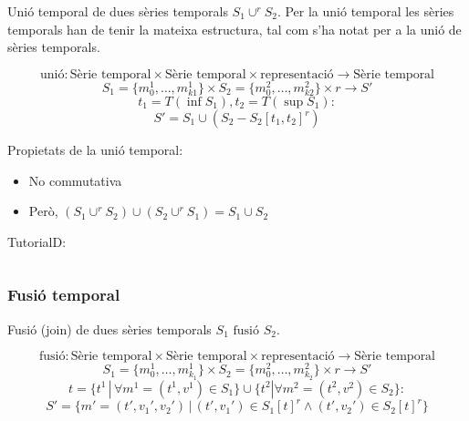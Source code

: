 Unió temporal de dues sèries temporals $S_1 \cup^r S_2$. Per la unió temporal les sèries temporals han de tenir la mateixa estructura, tal com s'ha notat per a la unió de sèries temporals.

\begin{definition}
  \[
  \text{unió}: \text{Sèrie temporal} \times \text{Sèrie temporal}
  \times \text{representació} \longrightarrow \text{Sèrie temporal}
  \]
  \[
  S_1 = \{m_0^1 , \ldots , m_{k1}^1\}  \times S_2 = \{m_0^2 , \ldots , m_{k2}^2\} \times r \longrightarrow S'
  \]
  \[
  t_1=T(\inf S_1), t_2=T(\sup S_1):
  \]
  \[
  S' = S_1 \cup  ( S_2 - S_2[t_1,t_2]^r )
  \] 
\end{definition}



Propietats de la unió temporal:
\begin{itemize}
\item No commutativa
\item Però, $(S_1 \cup^r S_2) \cup (S_2 \cup^r S_1) = S_1 \cup S_2$
\end{itemize}



TutorialD:
\begin{verbatim}

\end{verbatim}




\subsubsection{Fusió temporal}

Fusió (join) de dues sèries temporals $S_1 \text{ fusió } S_2$.


\begin{definition}
  \[
  \text{fusió}: \text{Sèrie temporal} \times
  \text{Sèrie temporal} \times \text{representació} \longrightarrow
  \text{Sèrie temporal}
  \]
  \[
  S_1 = \{m_0^1 , \ldots , m_{k_1}^1\} \times S_2 = \{m_0^2 , \ldots ,
  m_{k_2}^2\} \times r \longrightarrow S'
  \]
  \[
  t = \{t^1 \, | \, \forall m^1=(t^1,v^1) \in S_1\} \cup \{t^2 | \forall
  m^2=(t^2,v^2) \in S_2\}:
  \]
  \[
  S' = \{m'=(t',v_1',v_2') \, | \, (t',v_1') \in S_1[t]^r \wedge (t',v_2') \in S_2[t]^r \} 
  \]
\end{definition}



